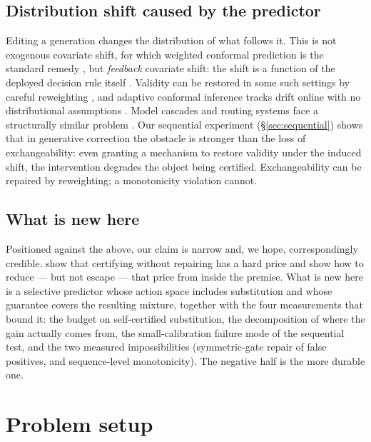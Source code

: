 \documentclass{article}
\theoremstyle{plain}
\theoremstyle{definition}
\theoremstyle{remark}
\begin{document}
\subsection{Distribution shift caused by the predictor}
\label{sec:rel:shift}

Editing a generation changes the distribution of what follows it. This is not exogenous
covariate shift, for which weighted conformal prediction is the standard remedy
\citep{tibshirani2019}, but \emph{feedback} covariate shift: the shift is a function of the
deployed decision rule itself \citep{fannjiang2022fcs}. Validity can be restored in some
such settings by careful reweighting \citep{anydist}, and adaptive conformal inference
tracks drift online with no distributional assumptions \citep{gibbs2021}. Model cascades
and routing systems face a structurally similar problem \citep{chen2023frugalgpt,gupta2024}.
Our sequential experiment (\S\ref{sec:sequential}) shows that in generative correction the
obstacle is stronger than the loss of exchangeability: even granting a mechanism to restore
validity under the induced shift, the intervention degrades the object being certified.
Exchangeability can be repaired by reweighting; a monotonicity violation cannot.

\subsection{What is new here}
\label{sec:rel:summary}

Positioned against the above, our claim is narrow and, we hope, correspondingly credible.
\citet{crcimposs} show that certifying without repairing has a hard price and \citet{bcea}
show how to reduce --- but not escape --- that price from inside the premise. What is new here
is a selective predictor whose action space includes substitution and whose guarantee covers
the resulting mixture, together with the four measurements that bound it: the budget on
self-certified substitution, the decomposition of where the gain actually comes from, the
small-calibration failure mode of the sequential test, and the two measured impossibilities
(symmetric-gate repair of false positives, and sequence-level monotonicity). The negative
half is the more durable one.

\section{Problem setup}
\label{sec:setup}
\end{document}
